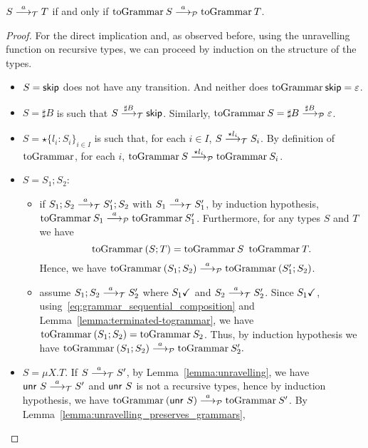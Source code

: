 \begin{lemma}
  \label{lem:transitions_mimic}
  $S \LTSderives T$ if and only if 
  $\toGrammarf{S} \LTSderivesP \toGrammarf T$.
\end{lemma}
%
\begin{proof}
	For the direct implication and, as observed before, 
	using the unravelling
	function on recursive types, we can proceed by induction
	on the structure of the types.
	
	\begin{itemize}
		\item $S=\skipk$ does not have any transition. And
		neither does $\toGrammarf{\skipk} = \varepsilon$.
		\item $S=\sharp B$ is such that $S \LTSderives[\sharp B] \skipk$.
		Similarly, $\toGrammarf{S} = \sharp B \LTSderivesP[\sharp B] \varepsilon$.
		\item $S=\star\{l_i\colon S_i\}_{i\in I}$ is such that, for each $i\in I$,
		$S \LTSderives[\star l_i] S_i$. By definition of $\toGrammark$, for each $i$, 
		$\toGrammarf{S} \LTSderivesP[\star l_i] \toGrammarf{S_i}$.
		\item $S=S_1;S_2$:
		\begin{itemize}
			\item if $S_1;S_2\LTSderives S_1';S_2$ with $S_1\LTSderives S_1'$,
			by induction hypothesis, $\toGrammarf{ S_1} \LTSderivesP \toGrammarf{S_1'}$.
			Furthermore, for any types $S$ and $T$ we have
			\begin{equation}
			\label{eq:grammar_sequential_composition}
				\toGrammarf{(S;T)} = \toGrammarf{S}\enspace\toGrammarf{T}.	
			\end{equation}
			Hence, we have $\toGrammarf{(S_1;S_2)} \LTSderivesP \toGrammarf{(S_1';S_2)}$.
			\item assume $S_1;S_2\LTSderives S_2'$ where 
				$\DONE{S_1}$ and
				$S_2\LTSderives S_2'$.
			Since $\DONE{S_1}$, 
			using~\eqref{eq:grammar_sequential_composition} and
			Lemma~\ref{lemma:terminated-togrammar}, 
			we have $\toGrammarf{(S_1;S_2)} = \toGrammarf{S_2}$.
			Thus, by induction hypothesis we have 
			$\toGrammarf{(S_1;S_2)} \LTSderivesP \toGrammarf{S_2'}.$
		\end{itemize}
		\item $S=\mu X.T$. If $S\LTSderives S'$, by Lemma~\ref{lemma:unravelling},
		we have $\Unravel\ S \LTSderives S'$ and $\Unravel\ S$ is not a recursive
		types, hence by induction hypothesis, we have
		$\toGrammarf{(\Unravel\ S)}\LTSderivesP \toGrammarf{S'}$.
		By Lemma~\ref{lemma:unravelling_preserves_grammars},

\end{itemize}
\end{proof}
